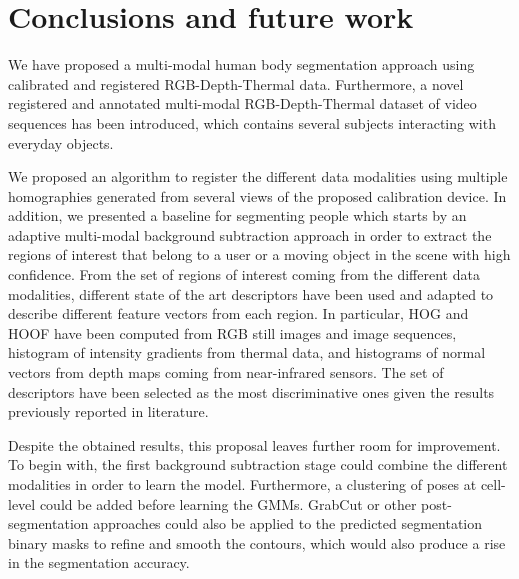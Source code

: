 \documentclass[10pt,twocolumn,letterpaper]{article}
\begin{document}
\section{Conclusions and future work}
\label{sec:conclusions}
We have proposed a multi-modal human body segmentation approach using calibrated and registered RGB-Depth-Thermal data. Furthermore, a novel registered and annotated multi-modal RGB-Depth-Thermal dataset of video sequences has been introduced, which contains several subjects interacting with everyday objects.

We proposed an algorithm to register the different data modalities using multiple homographies generated from several views of the proposed calibration device. In addition, we presented a baseline for segmenting people which starts by an adaptive multi-modal background subtraction approach in order to extract the regions of interest that belong to a user or a moving object in the scene with high confidence. From the set of regions of interest coming
from the different data modalities, different state of the art descriptors have been used
and adapted to describe different feature vectors from each region. In particular, HOG and HOOF have been computed from RGB still images and image sequences, histogram of intensity gradients from thermal data, and histograms of normal vectors from depth maps coming from near-infrared sensors. The set of descriptors have been selected as the most discriminative ones given the results previously reported in literature.

Despite the obtained results, this proposal leaves further room for improvement. To
begin with, the first background subtraction stage could combine the different modalities
in order to learn the model. Furthermore, a clustering of poses at cell-level could be
added before learning the GMMs. GrabCut or other post-segmentation approaches could also be applied to the predicted
segmentation binary masks to refine and smooth the contours, which would also produce
a rise in the segmentation accuracy.
{\small


}
\end{document}

